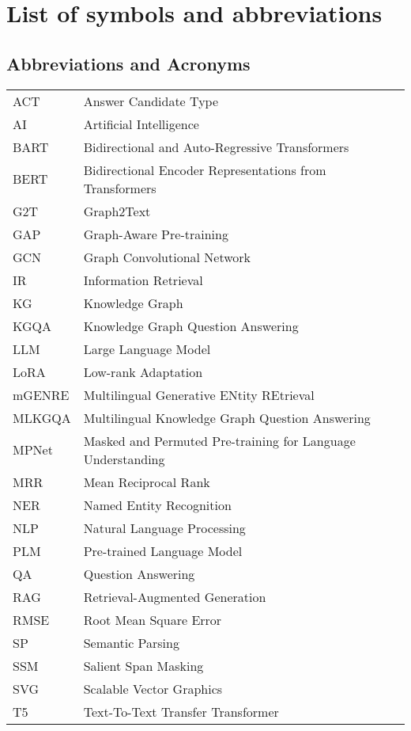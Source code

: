 

\chapter*{List of symbols and abbreviations}

\section*{Abbreviations and Acronyms}
\begin{tabularx}{0.9\textwidth}{lX}
    ACT & Answer Candidate Type \\
    AI & Artificial Intelligence \\
    BART & Bidirectional and Auto-Regressive Transformers \\
    BERT & Bidirectional Encoder Representations from Transformers \\
    G2T & Graph2Text \\
    GAP & Graph-Aware Pre-training \\
    GCN & Graph Convolutional Network \\
    IR & Information Retrieval \\
    KG & Knowledge Graph \\
    KGQA & Knowledge Graph Question Answering \\
    LLM & Large Language Model \\
    LoRA & Low-rank Adaptation \\
    mGENRE & Multilingual Generative ENtity REtrieval \\
    MLKGQA & Multilingual Knowledge Graph Question Answering \\
    MPNet & Masked and Permuted Pre-training for Language Understanding \\
    MRR & Mean Reciprocal Rank \\
    NER & Named Entity Recognition \\
    NLP & Natural Language Processing \\
    PLM & Pre-trained Language Model \\
    QA & Question Answering \\
    RAG & Retrieval-Augmented Generation \\
    RMSE & Root Mean Square Error \\
    SP & Semantic Parsing \\
    SSM & Salient Span Masking \\
    SVG & Scalable Vector Graphics \\
    T5 & Text-To-Text Transfer Transformer \\
\end{tabularx}

